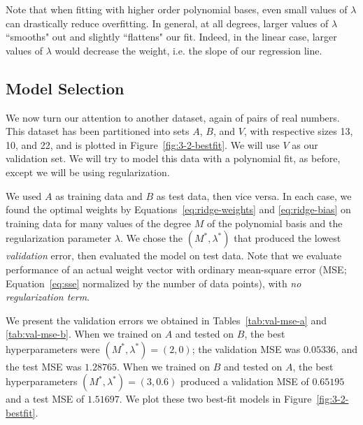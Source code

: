 \documentclass{article}
\begin{document}
\begin{multicols}{2}
Note that when fitting with higher order polynomial bases, even small values of $\lambda$ can drastically reduce overfitting. In general, at all degrees, larger values of $\lambda$ ``smooths" out and slightly ``flattens" our fit. Indeed, in the linear case, larger values of $\lambda$ would decrease the weight, i.e. the slope of our regression line.


\subsection{Model Selection}

We now turn our attention to another dataset, again of pairs of real numbers.
This dataset has been partitioned into sets $A$, $B$, and $V$, with respective sizes 13, 10, and 22, and is plotted in Figure~\ref{fig:3-2-bestfit}.
We will use $V$ as our validation set. We will try to model this data with a polynomial fit, as before, except we will be using regularization.

We used $A$ as training data and $B$ as test data, then vice versa.
In each case, we found the optimal weights by Equations~\ref{eq:ridge-weights} and \ref{eq:ridge-bias} on training data for many values of the degree $M$ of the polynomial basis and the regularization parameter $\lambda$. We chose the $(M^*, \lambda^*)$ that produced the lowest \emph{validation} error, then evaluated the model on test data.
Note that we evaluate performance of an actual weight vector with ordinary mean-square error (MSE; Equation~\ref{eq:sse} normalized by the number of data points), with \emph{no regularization term}.

We present the validation errors we obtained in Tables~\ref{tab:val-mse-a} and \ref{tab:val-mse-b}.
When we trained on $A$ and tested on $B$, the best hyperparameters were $(M^*,\lambda^*)=(2,0)$; the validation MSE was $0.05336$, and the test MSE was $1.28765$.
When we trained on $B$ and tested on $A$, the best hyperparameters $(M^*,\lambda^*)=(3,0.6)$ produced a validation MSE of $0.65195$ and a test MSE of $1.51697$.
We plot these two best-fit models in Figure~\ref{fig:3-2-bestfit}.



\end{multicols}
\end{document}
